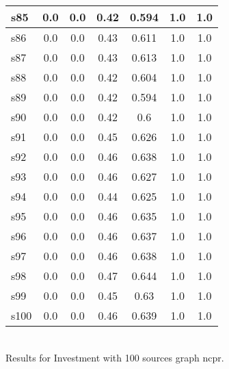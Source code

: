 \documentclass{article}
\begin{document}
\begin{tabular}{|l|c|c|c|c|c|c|}
\hline
s85 &0.0 & 0.0 & 0.42 & 0.594 & 1.0 & 1.0\\
\hline
s86 &0.0 & 0.0 & 0.43 & 0.611 & 1.0 & 1.0\\
\hline
s87 &0.0 & 0.0 & 0.43 & 0.613 & 1.0 & 1.0\\
\hline
s88 &0.0 & 0.0 & 0.42 & 0.604 & 1.0 & 1.0\\
\hline
s89 &0.0 & 0.0 & 0.42 & 0.594 & 1.0 & 1.0\\
\hline
s90 &0.0 & 0.0 & 0.42 & 0.6 & 1.0 & 1.0\\
\hline
s91 &0.0 & 0.0 & 0.45 & 0.626 & 1.0 & 1.0\\
\hline
s92 &0.0 & 0.0 & 0.46 & 0.638 & 1.0 & 1.0\\
\hline
s93 &0.0 & 0.0 & 0.46 & 0.627 & 1.0 & 1.0\\
\hline
s94 &0.0 & 0.0 & 0.44 & 0.625 & 1.0 & 1.0\\
\hline
s95 &0.0 & 0.0 & 0.46 & 0.635 & 1.0 & 1.0\\
\hline
s96 &0.0 & 0.0 & 0.46 & 0.637 & 1.0 & 1.0\\
\hline
s97 &0.0 & 0.0 & 0.46 & 0.638 & 1.0 & 1.0\\
\hline
s98 &0.0 & 0.0 & 0.47 & 0.644 & 1.0 & 1.0\\
\hline
s99 &0.0 & 0.0 & 0.45 & 0.63 & 1.0 & 1.0\\
\hline
s100 &0.0 & 0.0 & 0.46 & 0.639 & 1.0 & 1.0\\
\hline
\end{tabular}\\

\noindent Results for Investment with 100 sources graph ncpr.
\end{document}

